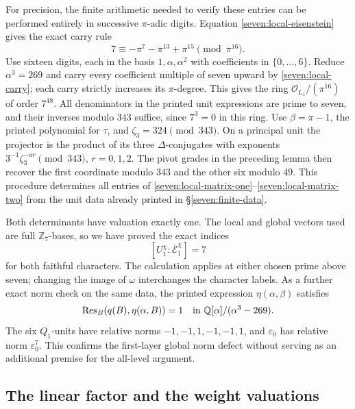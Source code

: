 For precision, the finite arithmetic needed to verify these entries
can be performed entirely in successive $\pi$-adic digits. Equation
\eqref{seven:local-eisenstein} gives the exact carry rule
\begin{equation*}\tag{U14}\label{seven:local-carry}
 7\equiv-\pi^7-\pi^{13}+\pi^{15}\pmod{\pi^{16}}.
\end{equation*}
Use sixteen digits, each in the basis
$1,\alpha,\alpha^2$ with coefficients in $\{0,\ldots,6\}$.
Reduce $\alpha^3=269$ and carry every coefficient multiple of seven
upward by \eqref{seven:local-carry}; each carry strictly increases its
$\pi$-degree. This gives the ring
$\mathcal O_{L_1}/(\pi^{16})$ of order $7^{48}$.
All denominators in the printed unit expressions are prime to seven,
and their inverses modulo $343$ suffice, since $7^3=0$ in this ring.
Use $\beta=\pi-1$, the printed polynomial for $\tau$, and
$\zeta_3=324\pmod{343}$. On a principal unit the projector is the
product of its three $\Delta$-conjugates with exponents
$3^{-1}\zeta_3^{-ar}\pmod{343}$, $r=0,1,2$.
The pivot grades in the preceding lemma then recover the first
coordinate modulo $343$ and the other six modulo $49$.
This procedure determines all entries of
\eqref{seven:local-matrix-one}--\eqref{seven:local-matrix-two} from the
unit data already printed in \S\ref{seven:finite-data}.

Both determinants have valuation exactly one. The local and global
vectors used are full $\mathbb Z_7$-bases, so we have proved the exact
indices
\begin{equation*}\tag{U15}\label{seven:first-layer-local-index}
 [U_1^\chi:\overline{\mathcal E}_1^\chi]=7
\end{equation*}
for both faithful characters. The calculation applies at either
chosen prime above seven; changing the image of $\omega$ interchanges
the character labels.
As a further exact norm check on the same data, the printed expression
$\eta(\alpha,\beta)$ satisfies
\[
 \operatorname{Res}_B(q(B),\eta(\alpha,B))=1
 \quad\hbox{in }\mathbb Q[\alpha]/(\alpha^3-269).
\]
The six $Q_1$-units have relative norms
$-1,-1,1,-1,-1,1$, and $\varepsilon_0$ has relative norm
$\varepsilon_0^7$. This confirms the first-layer global norm defect
without serving as an additional premise for the all-level argument.

\subsection{The linear factor and the weight valuations}

